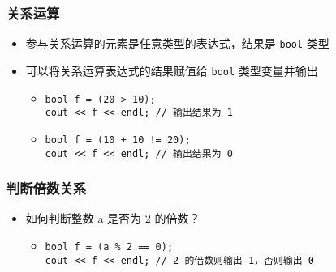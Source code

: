 \begin{frame}[fragile]
    \frametitle{关系运算}

    \begin{itemize}[<+->]
        \item 参与关系运算的元素是任意类型的表达式，结果是 \lstinline|bool| 类型

        \item 可以将关系运算表达式的结果赋值给 \lstinline|bool| 类型变量并输出

            \begin{itemize}
                \item
                    \lstinline|bool f = (20 > 10);|\\
                    \lstinline|cout << f << endl; // 输出结果为 1|

                \item
                    \lstinline|bool f = (10 + 10 != 20);|\\
                    \lstinline|cout << f << endl; // 输出结果为 0|
            \end{itemize}

    \end{itemize}
\end{frame}

\begin{frame}[fragile]
    \frametitle{判断倍数关系}

    \begin{itemize}[<+->]
        \item 如何判断整数 a 是否为 2 的倍数？

            \begin{itemize}
                \item \lstinline|bool f = (a % 2 == 0);|\\
                    \lstinline|cout << f << endl; // 2 的倍数则输出 1，否则输出 0|
            \end{itemize}

    \end{itemize}
\end{frame}

